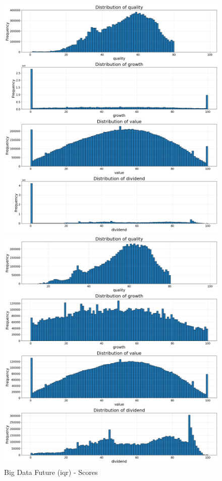 \documentclass[11pt,english,a4paper,hidelinks]{book}
\begin{document}
\begin{figure}[H]
    \centering
    \begin{minipage}{0.5\textwidth}
        \centering
        \includegraphics[width=\linewidth]{images/code/descriptive analysis/distributions/Big Data future IQR - Scores.png}
        \caption{Big Data Future (\acrshort{iqr}) - Scores}
        \label{fig:scores}
    \end{minipage}\hfill
    \begin{minipage}{0.5\textwidth}
        \centering
        \includegraphics[width=\linewidth]{images/code/descriptive analysis/distributions/Big Data future IQR - Scores Deep.png}

\end{minipage}
\end{figure}
\end{document}
